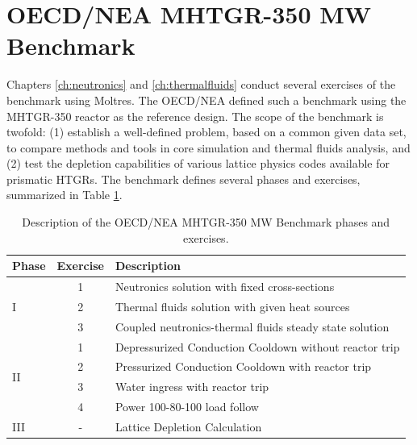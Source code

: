 \section{OECD/NEA MHTGR-350 MW Benchmark}
\label{sec:ch3-bench}

Chapters \ref{ch:neutronics} and \ref{ch:thermalfluids} conduct several exercises of the benchmark \cite{oecd_nea_benchmark_2017} using Moltres.
The \gls{OECD}/\gls{NEA} defined such a benchmark using the \gls{MHTGR}-350 reactor \cite{silady_licensing_1988} as the reference design.
The scope of the benchmark is twofold: (1) establish a well-defined problem, based on a common given data set, to compare methods and tools in core simulation and thermal fluids analysis, and (2) test the depletion capabilities of various lattice physics codes available for prismatic HTGRs.
The benchmark defines several phases and exercises, summarized in Table \ref{tab:benchmark}.

\begin{table}[htbp!]
  \centering
  \caption{Description of the OECD/NEA MHTGR-350 MW Benchmark phases and exercises.}
  \begin{tabular}{lcl}
\toprule
Phase               & Exercise & Description                                             \\
\midrule
\multirow{3}{*}{I}  & 1        & Neutronics solution with fixed cross-sections           \\
                    & 2        & Thermal fluids solution with given heat sources         \\
                    & 3        & Coupled neutronics-thermal fluids steady state solution \\
\midrule
\multirow{4}{*}{II} & 1        & Depressurized Conduction Cooldown without reactor trip  \\
                    & 2        & Pressurized Conduction Cooldown with reactor trip       \\
                    & 3        & Water ingress with reactor trip                         \\
                    & 4        & Power 100-80-100 load follow                            \\
\midrule
III                 & -        & Lattice Depletion Calculation                           \\
\bottomrule
  \end{tabular}
  \label{tab:benchmark}
\end{table}

